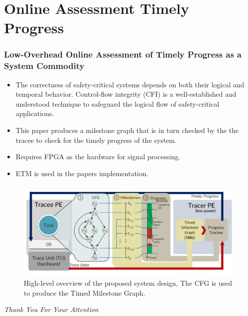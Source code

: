 \documentclass{beamer}
\begin{document}
\section{Online Assessment Timely Progress}
\begin{frame}
    \frametitle{Low-Overhead Online Assessment of Timely
    Progress as a System Commodity}
    \begin{itemize}
        \item The correctness of safety-critical systems depends on both their
            logical and temporal behavior. Control-flow integrity (CFI) is a
            well-established and understood technique to safeguard the logical
            flow of safety-critical applications. 
        \item This paper produces a milestone graph that is in turn checked
            by the the tracee to check for the timely progress of the system.
        \item Requires FPGA as the hardware for signal processing.
        \item ETM is used in the papers implementation.
    \end{itemize}
\end{frame}
\begin{frame}
    \frametitle{}
    \begin{figure}
        \centering
        \includegraphics[width=1.0\columnwidth]{tp.png}
        \caption{High-level overview of the proposed system design, The CFG is
        used to produce the Timed Milestone Graph.}
        \label{fig:tp}
    \end{figure}
\end{frame}
\begin{frame}
  \centering \Large
  \emph{Thank You For Your Attention}
\end{frame}
\end{document}
